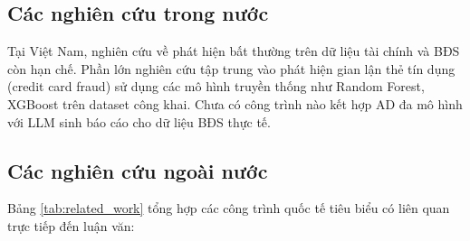 \subsection{Các nghiên cứu trong nước}

Tại Việt Nam, nghiên cứu về phát hiện bất thường trên dữ liệu tài chính và BĐS còn hạn chế. Phần lớn nghiên cứu tập trung vào phát hiện gian lận thẻ tín dụng (credit card fraud) sử dụng các mô hình truyền thống như Random Forest, XGBoost trên dataset công khai. Chưa có công trình nào kết hợp AD đa mô hình với LLM sinh báo cáo cho dữ liệu BĐS thực tế.

\subsection{Các nghiên cứu ngoài nước}

Bảng \ref{tab:related_work} tổng hợp các công trình quốc tế tiêu biểu có liên quan trực tiếp đến luận văn:

